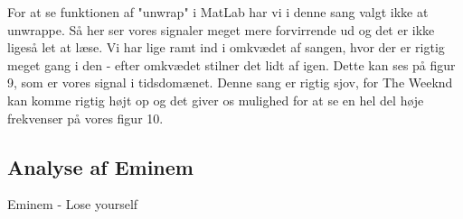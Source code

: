 \documentclass[12pt, letterpaper]{article}
\begin{document}
\begin{figure}[!h]
           \begin{floatrow}
       
           \end{floatrow}
\end{figure}

For at se funktionen af "unwrap" i MatLab har vi i denne sang valgt ikke at unwrappe. Så her ser vores signaler meget mere forvirrende ud og det er ikke ligeså let at læse. 
Vi har lige ramt ind i omkvædet af sangen, hvor der er rigtig meget gang i den - efter omkvædet stilner det lidt af igen. Dette kan ses på figur 9, som er vores signal i tidsdomænet. 
Denne sang er rigtig sjov, for The Weeknd kan komme rigtig højt op og det giver os mulighed for at se en hel del høje frekvenser på vores figur 10. 

\newpage


\subsection{Analyse af Eminem}
Eminem - Lose yourself
\end{document}
